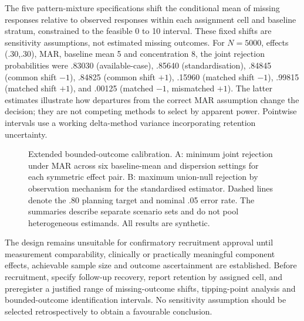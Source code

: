 The five pattern-mixture specifications shift the conditional mean of missing responses relative to observed responses within each assignment cell and baseline stratum, constrained to the feasible 0 to 10 interval. These fixed shifts are sensitivity assumptions, not estimated missing outcomes. For $N=5000$, effects (.30,.30), MAR, baseline mean 5 and concentration 8, the joint rejection probabilities were .83030 (available-case), .85640 (standardisation), .84845 (common shift $-1$), .84825 (common shift $+1$), .15960 (matched shift $-1$), .99815 (matched shift $+1$), and .00125 (matched $-1$, mismatched $+1$). The latter estimates illustrate how departures from the correct MAR assumption change the decision; they are not competing methods to select by apparent power. Pointwise intervals use a working delta-method variance incorporating retention uncertainty.

\begin{figure}[htbp]
\centering

\caption{Extended bounded-outcome calibration. A: minimum joint rejection under MAR across six baseline-mean and dispersion settings for each symmetric effect pair. B: maximum union-null rejection by observation mechanism for the standardised estimator. Dashed lines denote the .80 planning target and nominal .05 error rate. The summaries describe separate scenario sets and do not pool heterogeneous estimands. All results are synthetic.}
\label{fig:bounded-summary}
\end{figure}

The design remains unsuitable for confirmatory recruitment approval until measurement comparability, clinically or practically meaningful component effects, achievable sample size and outcome ascertainment are established. Before recruitment, specify follow-up recovery, report retention by assigned cell, and preregister a justified range of missing-outcome shifts, tipping-point analysis and bounded-outcome identification intervals. No sensitivity assumption should be selected retrospectively to obtain a favourable conclusion.
